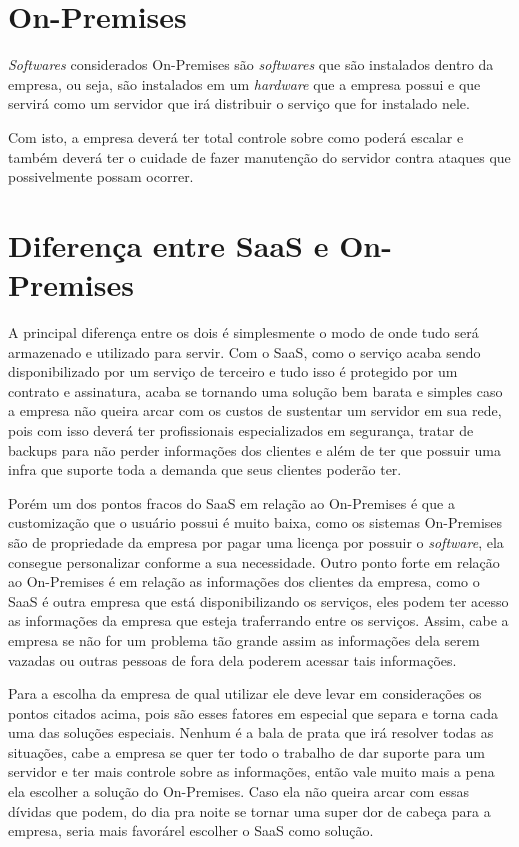 \documentclass[a4paper, 12pt]{article}
\begin{document}
\section{On-Premises}

\emph{Softwares} considerados On-Premises são \emph{softwares} que são instalados dentro da empresa, ou seja,
são instalados em um \emph{hardware} que a empresa possui e que servirá como um servidor que irá distribuir o serviço que for instalado nele.

Com isto, a empresa deverá ter total controle sobre como poderá escalar e também deverá ter o cuidade de fazer manutenção do servidor contra ataques que possivelmente possam ocorrer.

\section{Diferença entre SaaS e On-Premises}

A principal diferença entre os dois é simplesmente o modo de onde tudo será armazenado e utilizado para servir.
Com o SaaS, como o serviço acaba sendo disponibilizado por um serviço de terceiro e tudo isso é protegido por um contrato e assinatura,
acaba se tornando uma solução bem barata e simples caso a empresa não queira arcar com os custos de sustentar um servidor em sua rede,
pois com isso deverá ter profissionais especializados em segurança, tratar de backups para não perder informações dos clientes e além de ter que possuir uma infra que suporte toda a demanda que seus clientes poderão ter.

Porém um dos pontos fracos do SaaS em relação ao On-Premises é que a customização que o usuário possui é muito baixa,
como os sistemas On-Premises são de propriedade da empresa por pagar uma licença por possuir o \emph{software}, ela consegue personalizar conforme a sua necessidade.
Outro ponto forte em relação ao On-Premises é em relação as informações dos clientes da empresa, como o SaaS é outra empresa que está disponibilizando os serviços,
eles podem ter acesso as informações da empresa que esteja traferrando entre os serviços.
Assim, cabe a empresa se não for um problema tão grande assim as informações dela serem vazadas ou outras pessoas de fora dela poderem acessar tais informações.

Para a escolha da empresa de qual utilizar ele deve levar em considerações os pontos citados acima, pois são esses fatores em especial que separa e torna cada uma das soluções especiais.
Nenhum é a bala de prata que irá resolver todas as situações, cabe a empresa se quer ter todo o trabalho de dar suporte para um servidor e ter mais controle sobre as informações,
então vale muito mais a pena ela escolher a solução do On-Premises.
Caso ela não queira arcar com essas dívidas que podem, do dia pra noite se tornar uma super dor de cabeça para a empresa, seria mais favorárel escolher o SaaS como solução.

\nocite{*}


\end{document}
